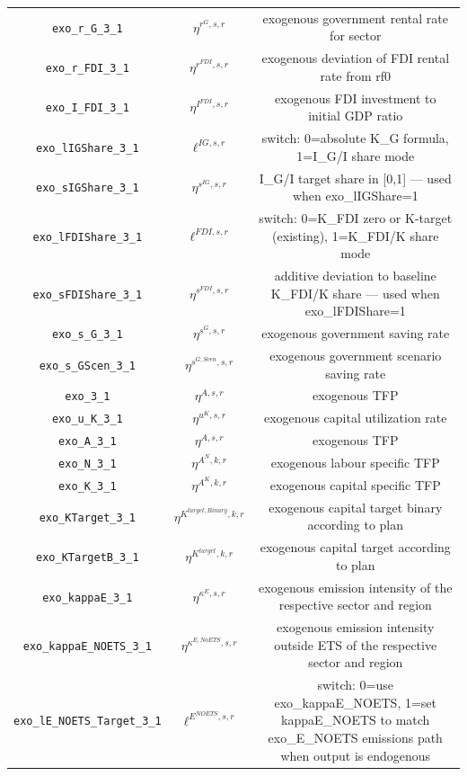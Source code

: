\begin{center}
\begin{longtable}{ccc}
\texttt{exo\_r\_G\_3\_1} & ${\eta^{r^G,s,r}}$ & exogenous government rental rate for sector\\
\texttt{exo\_r\_FDI\_3\_1} & ${\eta^{r^{FDI},s,r}}$ & exogenous deviation of FDI rental rate from rf0\\
\texttt{exo\_I\_FDI\_3\_1} & ${\eta^{I^{FDI},s,r}}$ & exogenous FDI investment to initial GDP ratio\\
\texttt{exo\_lIGShare\_3\_1} & ${\ell^{IG,s,r}}$ & switch: 0=absolute K\_G formula, 1=I\_G/I share mode\\
\texttt{exo\_sIGShare\_3\_1} & ${\eta^{s^{IG},s,r}}$ & I\_G/I target share in [0,1] — used when exo\_lIGShare=1\\
\texttt{exo\_lFDIShare\_3\_1} & ${\ell^{FDI,s,r}}$ & switch: 0=K\_FDI zero or K-target (existing), 1=K\_FDI/K share mode\\
\texttt{exo\_sFDIShare\_3\_1} & ${\eta^{s^{FDI},s,r}}$ & additive deviation to baseline K\_FDI/K share — used when exo\_lFDIShare=1\\
\texttt{exo\_s\_G\_3\_1} & ${\eta^{s^G,s,r}}$ & exogenous government saving rate\\
\texttt{exo\_s\_GScen\_3\_1} & ${\eta^{s^{G,Scen},s,r}}$ & exogenous government scenario saving rate\\
\texttt{exo\_3\_1} & ${\eta^{A,s,r}}$ & exogenous TFP\\
\texttt{exo\_u\_K\_3\_1} & ${\eta^{u^K,s,r}}$ & exogenous capital utilization rate\\
\texttt{exo\_A\_3\_1} & ${\eta^{A,s,r}}$ & exogenous TFP\\
\texttt{exo\_N\_3\_1} & ${\eta^{A^{N},k,r}}$ & exogenous labour specific TFP\\
\texttt{exo\_K\_3\_1} & ${\eta^{A^{K},k,r}}$ & exogenous capital specific TFP\\
\texttt{exo\_KTarget\_3\_1} & ${\eta^{K^{target,Binary},k,r}}$ & exogenous capital target binary according to plan\\
\texttt{exo\_KTargetB\_3\_1} & ${\eta^{K^{target},k,r}}$ & exogenous capital target according to plan\\
\texttt{exo\_kappaE\_3\_1} & ${\eta^{\kappa^{E},s,r}}$ & exogenous emission intensity of the respective sector and region\\
\texttt{exo\_kappaE\_NOETS\_3\_1} & ${\eta^{\kappa^{E,No ETS},s,r}}$ & exogenous emission intensity outside ETS of the respective sector and region\\
\texttt{exo\_lE\_NOETS\_Target\_3\_1} & ${\ell^{E^{NOETS},s,r}}$ & switch: 0=use exo\_kappaE\_NOETS, 1=set kappaE\_NOETS to match exo\_E\_NOETS emissions path when output is endogenous\\

\end{longtable}
\end{center}
